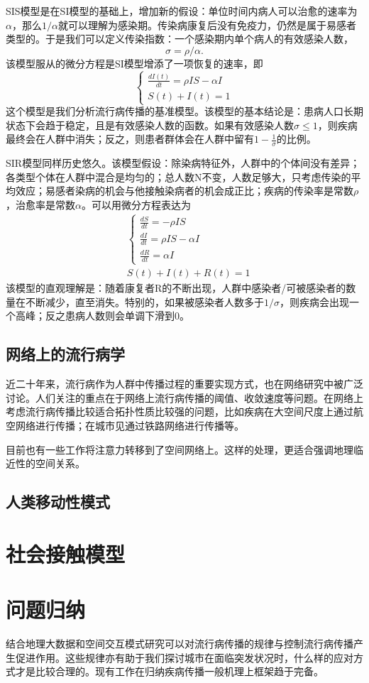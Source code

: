SIS模型是在SI模型的基础上，增加新的假设：单位时间内病人可以治愈的速率为$\alpha$，那么$1/\alpha$就可以理解为感染期。传染病康复后没有免疫力，仍然是属于易感者类型的。于是我们可以定义传染指数：一个感染期内单个病人的有效感染人数，\[\sigma = \rho/\alpha.\]该模型服从的微分方程是SI模型增添了一项恢复的速率，即\begin{equation}
    \left\{\begin{array}{l}
    {\frac{d I(t)}{d t}=\rho I S-\alpha I} \\
    {S(t)+I(t)=1}
    \end{array}\right.
    \end{equation}
这个模型是我们分析流行病传播的基准模型。该模型的基本结论是：患病人口长期状态下会趋于稳定，且是有效感染人数的函数。如果有效感染人数$\sigma\le 1$，则疾病最终会在人群中消失；反之，则患者群体会在人群中留有$1-\frac{1}{\sigma}$的比例。

SIR模型同样历史悠久\cite{kermack1927contribution}。该模型假设：除染病特征外，人群中的个体间没有差异；各类型个体在人群中混合是均匀的；总人数N不变，人数足够大，只考虑传染的平均效应；易感者染病的机会与他接触染病者的机会成正比；疾病的传染率是常数$\rho$，治愈率是常数$\alpha$。可以用微分方程表达为
\begin{equation}
    \begin{aligned}
    &\left\{\begin{array}{l}
    {\frac{d S}{d t}=-\rho I S} \\
    {\frac{d I}{d t}=\rho I S-\alpha I} \\
    {\frac{d R}{d t}=\alpha I}
    \end{array}\right.\\
    &S(t)+I(t)+R(t)=1
    \end{aligned}
\end{equation}
该模型的直观理解是：随着康复者R的不断出现，人群中感染者/可被感染者的数量在不断减少，直至消失。特别的，如果被感染者人数多于$1/\sigma$，则疾病会出现一个高峰；反之患病人数则会单调下滑到$0$。

\subsection{网络上的流行病学}

近二十年来，流行病作为人群中传播过程的重要实现方式，也在网络研究中被广泛讨论。人们关注的重点在于网络上流行病传播的阈值、收敛速度等问题。在网络上考虑流行病传播比较适合拓扑性质比较强的问题，比如疾病在大空间尺度上通过航空网络进行传播；在城市见通过铁路网络进行传播等。

目前也有一些工作将注意力转移到了空间网络上。这样的处理，更适合强调地理临近性的空间关系。

\subsection{人类移动性模式}



\section{社会接触模型}

\section{问题归纳}

结合地理大数据和空间交互模式研究可以对流行病传播的规律与控制流行病传播产生促进作用。这些规律亦有助于我们探讨城市在面临突发状况时，什么样的应对方式才是比较合理的。现有工作在归纳疾病传播一般机理上框架趋于完备。